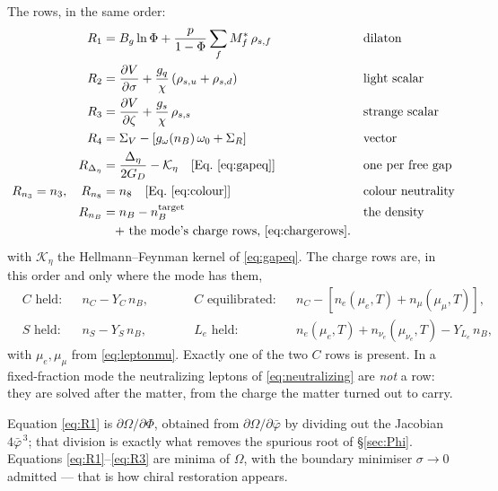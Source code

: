 \documentclass[11pt,a4paper]{article}
\newcommand{\phib}{\bar\varphi}
\newcommand{\Mstar}{M^{*}}
\begin{document}
The rows, in the same order:
\begin{align}
R_1 &= B_g\ln\Phi + \frac{p}{1-\Phi}\sum_f \Mstar_f\,\rho_{s,f} &&\text{dilaton}
\label{eq:R1}\\
R_2 &= \frac{\partial V}{\partial\sigma}
 + \frac{g_q}{\chi}\left(\rho_{s,u}+\rho_{s,d}\right) &&\text{light scalar}
\label{eq:R2}\\
R_3 &= \frac{\partial V}{\partial\zeta}
 + \frac{g_s}{\chi}\,\rho_{s,s} &&\text{strange scalar}
\label{eq:R3}\\
R_4 &= \Sigma_V - \left[g_\omega(n_B)\,\omega_0 + \Sigma_R\right] &&\text{vector}
\label{eq:R4}\\
R_{\Delta_\eta} &= \frac{\Delta_\eta}{2G_D} - \mathcal K_\eta
 \quad\text{[Eq.~\eqref{eq:gapeq}]} &&\text{one per free gap}\\
R_{n_3} = n_3,\quad R_{n_8} &= n_8
 \quad\text{[Eq.~\eqref{eq:colour}]} &&\text{colour neutrality}\\
R_{n_B} &= n_B - n_B^{\rm target} &&\text{the density}\\
&\quad\text{+ the mode's charge rows, \eqref{eq:chargerows}}. \nonumber
\end{align}
with $\mathcal K_\eta$ the Hellmann--Feynman kernel of \eqref{eq:gapeq}. The
charge rows are, in this order and only where the mode has them,
\begin{equation}
\begin{aligned}
&\text{$C$ held:}    &&n_C - Y_C\,n_B, &&\qquad
 \text{$C$ equilibrated:} &&n_C - \left[n_e(\mu_e,T)+n_\mu(\mu_\mu,T)\right],\\
&\text{$S$ held:}    &&n_S - Y_S\,n_B, &&\qquad
 \text{$L_e$ held:} &&n_e(\mu_e,T)+n_{\nu_e}(\mu_{\nu_e},T) - Y_{L_e}\,n_B,
\end{aligned}
\label{eq:chargerows}
\end{equation}
with $\mu_e,\mu_\mu$ from \eqref{eq:leptonmu}. Exactly one of the two $C$ rows
is present. In a fixed-fraction mode the neutralizing leptons of
\eqref{eq:neutralizing} are \emph{not} a row: they are solved after the matter,
from the charge the matter turned out to carry.

Equation \eqref{eq:R1} is $\partial\Omega/\partial\Phi$, obtained from
$\partial\Omega/\partial\phib$ by dividing out the Jacobian $4\phib^{\,3}$;
that division is exactly what removes the spurious root of
\S\ref{sec:Phi}. Equations \eqref{eq:R1}--\eqref{eq:R3} are minima of $\Omega$,
with the boundary minimiser $\sigma\to0$ admitted --- that is how chiral
restoration appears.
\end{document}
